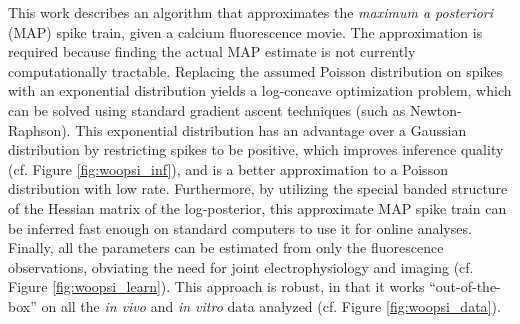 \documentclass{article}
\begin{document}
This work describes an algorithm that approximates the \emph{maximum a posteriori} (MAP) spike train, given a calcium fluorescence movie.  The approximation is required because finding the actual MAP estimate is not currently computationally tractable.  Replacing the assumed Poisson distribution on spikes with an exponential distribution yields a log-concave optimization problem, which can be solved using standard gradient ascent techniques (such as Newton-Raphson).  This exponential distribution has an advantage over a Gaussian distribution by restricting spikes to be positive, which improves inference quality (cf. Figure \ref{fig:woopsi_inf}), and is a better approximation to a Poisson distribution with low rate.  %
Furthermore, by utilizing the special banded structure of the Hessian matrix of the log-posterior, this approximate MAP spike train can be inferred fast enough on standard computers to use it for online analyses.  Finally, all the parameters can be estimated from only the fluorescence observations, obviating the need for joint electrophysiology and imaging (cf. Figure \ref{fig:woopsi_learn}).  This approach is robust, in that it works ``out-of-the-box'' on all the \emph{in vivo} and \emph{in vitro} data analyzed (cf. Figure \ref{fig:woopsi_data}).
\end{document}
